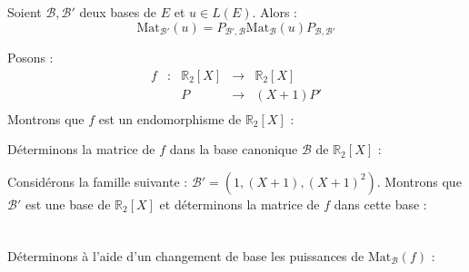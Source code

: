 \documentclass[a4paper,10pt]{report}
\begin{document}
\begin{cor} Soient $\mathcal{B}, \mathcal{B}'$ deux bases de $E$ et $u \in L(E)$. Alors :
$$ \textrm{Mat}_{\mathcal{B}'}(u) = P_{\mathcal{B}', \mathcal{B}}  \textrm{Mat}_{\mathcal{B}}(u)  P_{\mathcal{B}, \mathcal{B}'}$$
\end{cor}

\begin{ex} Posons :
$$ \begin{array}{ccccl}
f & : & \mathbb{R}_2[X] & \rightarrow & \mathbb{R}_2[X] \\
& & P & \rightarrow & (X+1)P' \\
\end{array} $$
\noindent Montrons que $f$ est un endomorphisme de $ \mathbb{R}_2[X]$ :

\vspace{3cm}


\noindent Déterminons la matrice de $f$ dans la base canonique $\mathcal{B}$ de $\mathbb{R}_2[X]$ :

\vspace{5cm}

\noindent Considérons la famille suivante : $\mathcal{B}'= (1, (X+1),(X+1)^2)$. Montrons que $\mathcal{B}'$ est une base de $\mathbb{R}_2[X]$ et déterminons la matrice de $f$ dans cette base :

\newpage
$\phantom{test}$

\vspace{6.5cm}

\noindent Déterminons à l'aide d'un changement de base les puissances de $\textrm{Mat}_{\mathcal{B}}(f)$ :


\end{ex}
\end{document}
